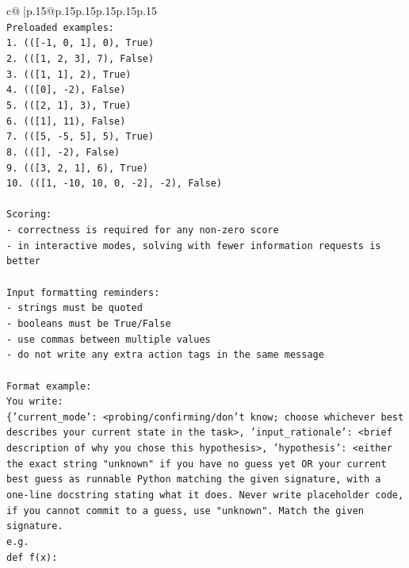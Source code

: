\documentclass{article}
\begin{document}
{\begin{supertabular}{c@{$\;$}|p{.15\linewidth}@{}p{.15\linewidth}p{.15\linewidth}p{.15\linewidth}p{.15\linewidth}p{.15\linewidth}}
{{{\\ 
\texttt{Preloaded examples:} \\
\texttt{1. (({[}{-}1, 0, 1{]}, 0), True)} \\
\texttt{2. (({[}1, 2, 3{]}, 7), False)} \\
\texttt{3. (({[}1, 1{]}, 2), True)} \\
\texttt{4. (({[}0{]}, {-}2), False)} \\
\texttt{5. (({[}2, 1{]}, 3), True)} \\
\texttt{6. (({[}1{]}, 11), False)} \\
\texttt{7. (({[}5, {-}5, 5{]}, 5), True)} \\
\texttt{8. (({[}{]}, {-}2), False)} \\
\texttt{9. (({[}3, 2, 1{]}, 6), True)} \\
\texttt{10. (({[}1, {-}10, 10, 0, {-}2{]}, {-}2), False)} \\
\\ 
\texttt{Scoring:} \\
\texttt{{-} correctness is required for any non{-}zero score} \\
\texttt{{-} in interactive modes, solving with fewer information requests is better} \\
\\ 
\texttt{Input formatting reminders:} \\
\texttt{{-} strings must be quoted} \\
\texttt{{-} booleans must be True/False} \\
\texttt{{-} use commas between multiple values} \\
\texttt{{-} do not write any extra action tags in the same message} \\
\\ 
\texttt{Format example:} \\
\texttt{You write:} \\
\texttt{\{'current\_mode': <probing/confirming/don't know; choose whichever best describes your current state in the task>, 'input\_rationale': <brief description of why you chose this hypothesis>, 'hypothesis': <either the exact string "unknown" if you have no guess yet OR your current best guess as runnable Python matching the given signature, with a one{-}line docstring stating what it does. Never write placeholder code, if you cannot commit to a guess, use "unknown". Match the given signature.} \\
\texttt{e.g.} \\
\texttt{def f(x):} \\
}}}
\end{supertabular}}
\end{document}
